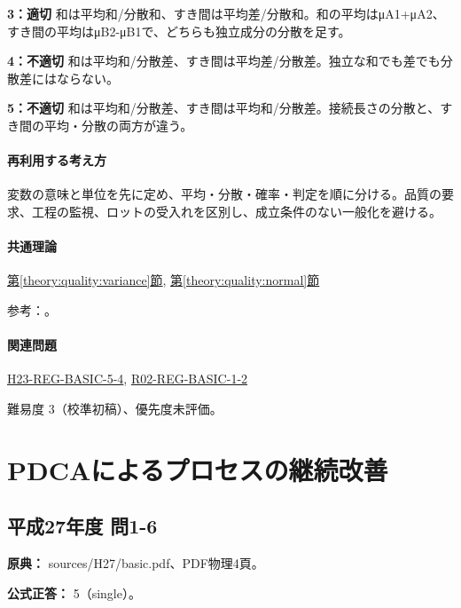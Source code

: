 \noindent\textbf{3：適切} 和は平均和/分散和、すき間は平均差/分散和。和の平均はμA1+μA2、すき間の平均はμB2-μB1で、どちらも独立成分の分散を足す。\par

\noindent\textbf{4：不適切} 和は平均和/分散差、すき間は平均差/分散差。独立な和でも差でも分散差にはならない。\par

\noindent\textbf{5：不適切} 和は平均和/分散差、すき間は平均和/分散差。接続長さの分散と、すき間の平均・分散の両方が違う。\par

\paragraph{再利用する考え方} 変数の意味と単位を先に定め、平均・分散・確率・判定を順に分ける。品質の要求、工程の監視、ロットの受入れを区別し、成立条件のない一般化を避ける。

\paragraph{共通理論} \hyperref[theory:quality:variance]{第\ref*{theory:quality:variance}節}, \hyperref[theory:quality:normal]{第\ref*{theory:quality:normal}節}

\par 参考：\cite{stat_nist_normal,stat_psu_linear}。

\paragraph{関連問題} \hyperref[q:h23-reg-basic-5-4]{H23-REG-BASIC-5-4}, \hyperref[q:r02-reg-basic-1-2]{R02-REG-BASIC-1-2}

\par 難易度 3（校準初稿）、優先度未評価。

\section{PDCAによるプロセスの継続改善}

\subsection{平成27年度 問1-6}
\label{q:h27-reg-basic-1-6}

\noindent\textbf{原典：} sources/H27/basic.pdf、PDF物理4頁。

\textbf{公式正答：} 5（single）。

